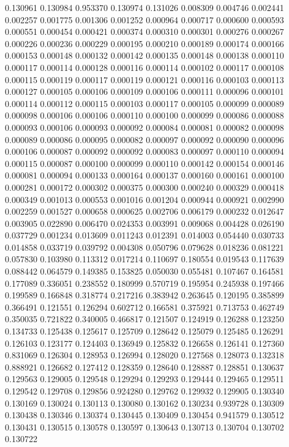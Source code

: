 0.130961
0.130984
0.953370
0.130974
0.131026
0.008309
0.004746
0.002441
0.002257
0.001775
0.001306
0.001252
0.000964
0.000717
0.000600
0.000593
0.000551
0.000454
0.000421
0.000374
0.000310
0.000301
0.000276
0.000267
0.000226
0.000236
0.000229
0.000195
0.000210
0.000189
0.000174
0.000166
0.000153
0.000148
0.000132
0.000142
0.000135
0.000148
0.000138
0.000110
0.000117
0.000114
0.000128
0.000116
0.000114
0.000102
0.000117
0.000108
0.000115
0.000119
0.000117
0.000119
0.000121
0.000116
0.000103
0.000113
0.000127
0.000105
0.000106
0.000109
0.000106
0.000111
0.000096
0.000101
0.000114
0.000112
0.000115
0.000103
0.000117
0.000105
0.000099
0.000089
0.000098
0.000106
0.000106
0.000110
0.000100
0.000099
0.000086
0.000088
0.000093
0.000106
0.000093
0.000092
0.000084
0.000081
0.000082
0.000098
0.000089
0.000086
0.000095
0.000082
0.000097
0.000092
0.000090
0.000096
0.000106
0.000087
0.000092
0.000092
0.000083
0.000097
0.000110
0.000094
0.000115
0.000087
0.000100
0.000099
0.000110
0.000142
0.000154
0.000146
0.000081
0.000094
0.000133
0.000164
0.000137
0.000160
0.000161
0.000100
0.000281
0.000172
0.000302
0.000375
0.000300
0.000240
0.000329
0.000418
0.000349
0.001013
0.000553
0.001016
0.001204
0.000944
0.000921
0.002990
0.002259
0.001527
0.000658
0.000625
0.002706
0.006179
0.000232
0.012647
0.003905
0.022890
0.006470
0.024353
0.003991
0.009068
0.004428
0.026190
0.037729
0.001234
0.013609
0.011243
0.012391
0.014003
0.054440
0.030733
0.014858
0.033719
0.039792
0.004308
0.050796
0.079628
0.018236
0.081221
0.057830
0.103980
0.113312
0.017214
0.110697
0.180554
0.019543
0.117639
0.088442
0.064579
0.149385
0.153825
0.050030
0.055481
0.107467
0.164581
0.177089
0.336051
0.238552
0.180999
0.570719
0.195954
0.245938
0.197466
0.199589
0.166848
0.318774
0.217216
0.383942
0.263645
0.120195
0.385899
0.366491
0.121551
0.126294
0.602712
0.166581
0.375921
0.713753
0.462749
0.350035
0.721822
0.340005
0.466817
0.121507
0.124919
0.126288
0.123250
0.134733
0.125438
0.125617
0.125709
0.128642
0.125079
0.125485
0.126291
0.126103
0.123177
0.124403
0.136949
0.125832
0.126658
0.126141
0.127360
0.831069
0.126304
0.128953
0.126994
0.128020
0.127568
0.128073
0.132318
0.888921
0.126682
0.127412
0.128359
0.128640
0.128887
0.128851
0.130637
0.129563
0.129005
0.129548
0.129294
0.129293
0.129444
0.129465
0.129511
0.129542
0.129708
0.129856
0.924280
0.129762
0.129932
0.129905
0.130340
0.130169
0.130024
0.130113
0.130080
0.130162
0.130234
0.939728
0.130309
0.130438
0.130346
0.130374
0.130445
0.130409
0.130454
0.941579
0.130512
0.130431
0.130515
0.130578
0.130597
0.130643
0.130713
0.130704
0.130702
0.130722
